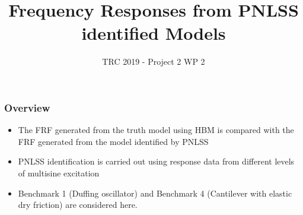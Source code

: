 \documentclass[aspectratio=169]{beamer}
\title{Frequency Responses from PNLSS identified Models}
\author{TRC 2019 - Project 2 WP 2}
\begin{document}
\maketitle{}

\begin{frame}
  \frametitle{Overview}
  \begin{itemize}
  \item The FRF generated from the truth model using HBM is compared
    with the FRF generated from the model identified by PNLSS
  \item PNLSS identification is carried out using response data from
    different levels of multisine excitation
  \item Benchmark 1 (Duffing oscillator) and Benchmark 4 (Cantilever
    with elastic dry friction) are considered here.
  \end{itemize}
\end{frame}
\end{document}

